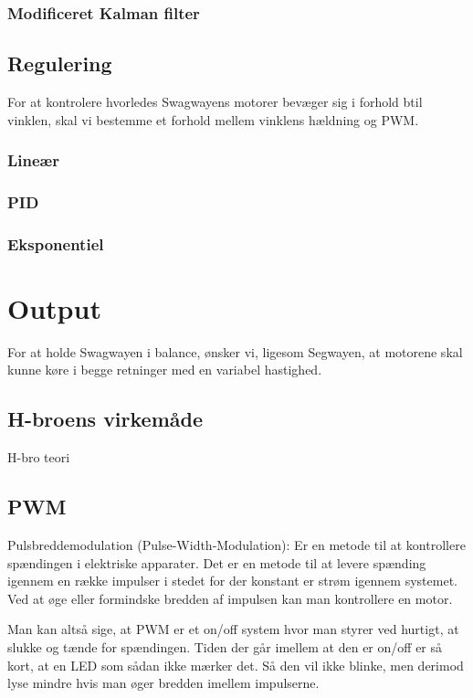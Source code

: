 \documentclass[a4paper,oneside,article,danish,table]{memoir}
\begin{document}
\subsection{Modificeret Kalman filter}

\section{Regulering}
For at kontrolere hvorledes Swagwayens motorer bevæger sig i forhold btil vinklen, skal vi bestemme et forhold mellem vinklens hældning og PWM. 
\subsection{Lineær}
\subsection{PID}
\subsection{Eksponentiel}

\chapter{Output}
For at holde Swagwayen i balance, ønsker vi, ligesom Segwayen, at motorene skal kunne køre i begge retninger med en variabel hastighed.
\section{H-broens virkemåde}
H-bro teori
\section{PWM}
Pulsbreddemodulation (Pulse-Width-Modulation): Er en metode til at kontrollere spændingen i elektriske
apparater. Det er en metode til at levere spænding igennem en række impulser i stedet for der konstant er strøm igennem systemet. Ved at øge eller formindske bredden af impulsen kan man kontrollere en motor.

Man kan altså sige, at PWM er et on/off system hvor man styrer ved hurtigt, at slukke og tænde for
spændingen. Tiden der går imellem at den er on/off er så kort, at en LED som sådan ikke mærker det. Så
den vil ikke blinke, men derimod lyse mindre hvis man øger bredden imellem impulserne.
\end{document}
